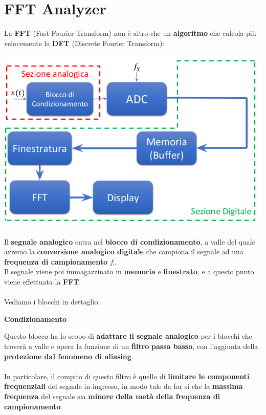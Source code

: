 \chapter{FFT Analyzer}
La \textbf{FFT} (Fast Fourier Transform) non è altro che un \textbf{algoritmo} che calcola più velocemente la \textbf{DFT} (Discrete Fourier Transform):
\begin{center}
    \includegraphics[width=\textwidth]{Images/figure30.png}
\end{center}
Il \textbf{segnale analogico} entra nel \textbf{blocco di condizionamento}, a valle del quale avremo la \textbf{conversione analogico digitale} che campiona il segnale ad una \textbf{frequenza di campionamento} $f_c$.\\
Il segnale viene poi immagazzinato in \textbf{memoria} e \textbf{finestrato}, e a questo punto viene effettuata la \textbf{FFT}.\\ \\
Vediamo i blocchi in dettaglio:\\
\begin{center}
    \textbf{Condizionamento}
\end{center}
Questo blocco ha lo scopo di \textbf{adattare il segnale analogico} per i blocchi che troverà a valle e opera la funzione di un \textbf{filtro} \textbf{passa basso}, con l'aggiunta della \textbf{protezione dal fenomeno di aliasing}.\\ \\
In particolare, il compito di questo filtro è quello di \textbf{limitare le componenti frequenziali} del segnale in ingresso, in modo tale da far si che la \textbf{massima frequenza }del segnale sia \textbf{minore della metà della frequenza di campionamento}.\\ \\
